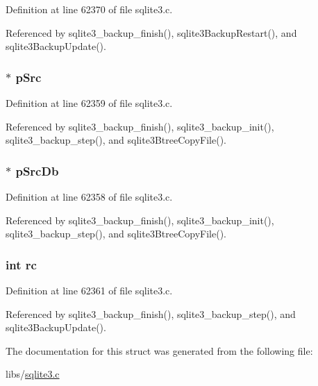 Definition at line 62370 of file sqlite3.\+c.



Referenced by sqlite3\+\_\+backup\+\_\+finish(), sqlite3\+Backup\+Restart(), and sqlite3\+Backup\+Update().

\hypertarget{structsqlite3__backup_aee09321030964a76af7f5e63ea20cb9c}{}
\subsubsection[{p\+Src}]{$\ast$ p\+Src}\label{structsqlite3__backup_aee09321030964a76af7f5e63ea20cb9c}


Definition at line 62359 of file sqlite3.\+c.



Referenced by sqlite3\+\_\+backup\+\_\+finish(), sqlite3\+\_\+backup\+\_\+init(), sqlite3\+\_\+backup\+\_\+step(), and sqlite3\+Btree\+Copy\+File().

\hypertarget{structsqlite3__backup_a6ad9342dfbfe7f65e4f4c9c74b4d082b}{}
\subsubsection[{p\+Src\+Db}]{$\ast$ p\+Src\+Db}\label{structsqlite3__backup_a6ad9342dfbfe7f65e4f4c9c74b4d082b}


Definition at line 62358 of file sqlite3.\+c.



Referenced by sqlite3\+\_\+backup\+\_\+finish(), sqlite3\+\_\+backup\+\_\+init(), sqlite3\+\_\+backup\+\_\+step(), and sqlite3\+Btree\+Copy\+File().

\hypertarget{structsqlite3__backup_ac6509c6fe4cbf7bde170597172f8a288}{}
\subsubsection[{rc}]{\setlength{\rightskip}{0pt plus 5cm}int rc}\label{structsqlite3__backup_ac6509c6fe4cbf7bde170597172f8a288}


Definition at line 62361 of file sqlite3.\+c.



Referenced by sqlite3\+\_\+backup\+\_\+finish(), sqlite3\+\_\+backup\+\_\+step(), and sqlite3\+Backup\+Update().



The documentation for this struct was generated from the following file\+:\begin{DoxyCompactItemize}
\item 
libs/\hyperlink{sqlite3_8c}{sqlite3.\+c}\end{DoxyCompactItemize}
